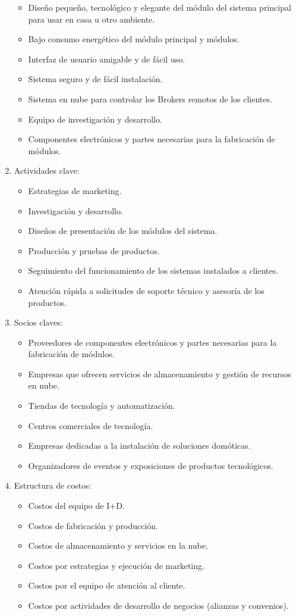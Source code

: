\documentclass[11pt]{charter}
\begin{document}
\begin{enumerate}
\begin{itemize}
\item Diseño pequeño, tecnológico y elegante del módulo del sistema principal para usar en casa u otro ambiente.
\item Bajo consumo energético del módulo principal y módulos.
\item Interfaz de usuario amigable y de fácil uso.
\item Sistema seguro y de fácil instalación.
\item Sistema en nube para controlar los Brokers remotos de los clientes.
\item Equipo de investigación y desarrollo.
\item Componentes electrónicos y partes necesarias para la fabricación de módulos.
\end{itemize}
\item Actividades clave:
\begin{itemize}
\item Estrategias de marketing.
\item Investigación y desarrollo.
\item Diseños de presentación de los módulos del sistema.
\item Producción y pruebas de productos.
\item Seguimiento del funcionamiento de los sistemas instalados a clientes.
\item Atención rápida a solicitudes de soporte técnico y asesoría de los productos. 
\end{itemize}
\item Socios claves:
\begin{itemize}
\item Proveedores de componentes electrónicos y partes necesarias para la fabricación de módulos.
\item Empresas que ofrecen servicios de almacenamiento y gestión de recursos en nube.
\item Tiendas de tecnología y automatización.
\item Centros comerciales de tecnología.
\item Empresas dedicadas a la instalación de soluciones domóticas.
\item Organizadores de eventos y exposiciones de productos tecnológicos.
\end{itemize}
\item Estructura de costos:
\begin{itemize}
\item Costos del equipo de I+D.
\item Costos de fabricación y producción.
\item Costos de almacenamiento y servicios en la nube.
\item Costos por estrategias y ejecución de marketing.
\item Costos por el equipo de atención al cliente.
\item Costos por actividades de desarrollo de negocios (alianzas y convenios).
\end{itemize}
\end{enumerate}
\end{document}
